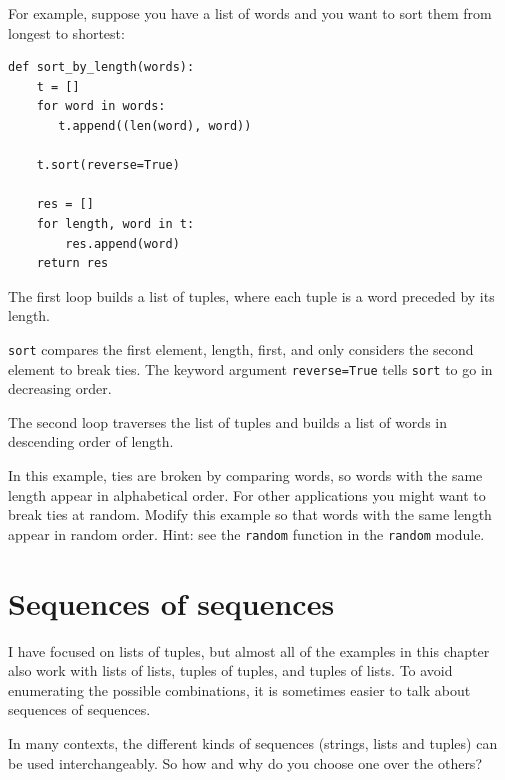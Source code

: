 \documentclass[10pt]{book}
\begin{document}
\label{DSU}

For example, suppose you have a list of words and you want to
sort them from longest to shortest:

\beforeverb
\begin{verbatim}
def sort_by_length(words):
    t = []
    for word in words:
       t.append((len(word), word))

    t.sort(reverse=True)

    res = []
    for length, word in t:
        res.append(word)
    return res
\end{verbatim}
\afterverb
%
The first loop builds a list of tuples, where each
tuple is a word preceded by its length.

{\tt sort} compares the first element, length, first, and
only considers the second element to break ties.  The keyword argument
{\tt reverse=True} tells {\tt sort} to go in decreasing order.


The second loop traverses the list of tuples and builds a list of
words in descending order of length.

\begin{ex}
In this example, ties are broken by comparing words, so words
with the same length appear in alphabetical order.  For other
applications you might want to break ties at random.  Modify
this example so that words with the same length appear in
random order.  Hint: see the {\tt random} function in the
{\tt random} module.


\end{ex}


\section{Sequences of sequences}

I have focused on lists of tuples, but almost all of the examples in
this chapter also work with lists of lists, tuples of tuples, and
tuples of lists.  To avoid enumerating the possible combinations, it
is sometimes easier to talk about sequences of sequences.

In many contexts, the different kinds of sequences (strings, lists and
tuples) can be used interchangeably.  So how and why do you choose one
over the others?
\end{document}
